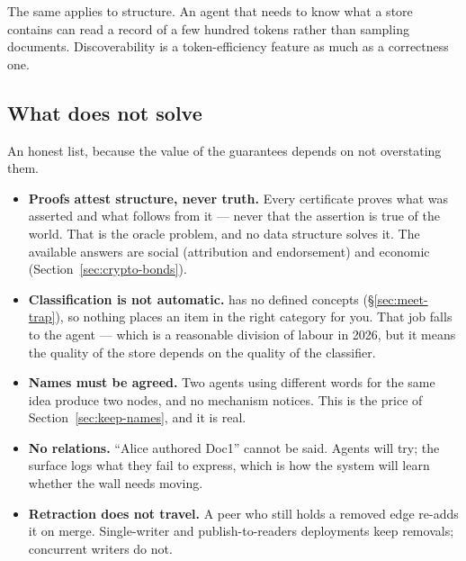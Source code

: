 The same applies to structure. An agent that needs to know what a store
contains can read a  record of a few hundred tokens rather than
sampling documents. Discoverability is a token-efficiency feature as much as a
correctness one.

\subsection{What \odag{} does not solve}

An honest list, because the value of the guarantees depends on not
overstating them.

\begin{itemize}[leftmargin=1.4em]
\item \textbf{Proofs attest structure, never truth.} Every certificate proves
  what was asserted and what follows from it --- never that the assertion is
  true of the world. That is the oracle problem, and no data structure solves
  it. The available answers are social (attribution and endorsement) and
  economic (Section~\ref{sec:crypto-bonds}).
\item \textbf{Classification is not automatic.} \odag{} has no defined
  concepts (\S\ref{sec:meet-trap}), so nothing places an item in the right
  category for you. That job falls to the agent --- which is a reasonable
  division of labour in 2026, but it means the quality of the store depends on
  the quality of the classifier.
\item \textbf{Names must be agreed.} Two agents using different words for the
  same idea produce two nodes, and no mechanism notices. This is the price of
  Section~\ref{sec:keep-names}, and it is real.
\item \textbf{No relations.} ``Alice authored Doc1'' cannot be said. Agents
  will try; the surface logs what they fail to express, which is how the
  system will learn whether the wall needs moving.
\item \textbf{Retraction does not travel.} A peer who still holds a removed
  edge re-adds it on merge. Single-writer and publish-to-readers deployments
  keep removals; concurrent writers do not.
\end{itemize}
